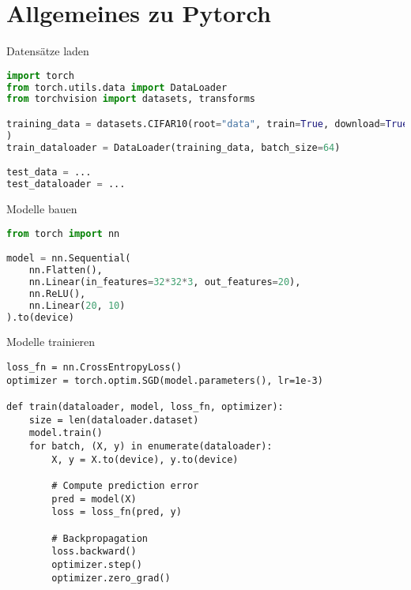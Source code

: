 \section{Allgemeines zu Pytorch}

\begin{frame}[fragile]{Datensätze laden}
\begin{lstlisting}[language=Python]
import torch
from torch.utils.data import DataLoader
from torchvision import datasets, transforms

training_data = datasets.CIFAR10(root="data", train=True, download=True, transform=transforms.ToTensor()
)
train_dataloader = DataLoader(training_data, batch_size=64)

test_data = ...
test_dataloader = ...
\end{lstlisting}
\end{frame}

  
\begin{frame}[fragile]{Modelle bauen}
\begin{lstlisting}[language=Python]
from torch import nn

model = nn.Sequential(
    nn.Flatten(),
    nn.Linear(in_features=32*32*3, out_features=20),
    nn.ReLU(),
    nn.Linear(20, 10)
).to(device)

\end{lstlisting}
\end{frame}


\begin{frame}{Modelle trainieren}
\begin{lstlisting}
loss_fn = nn.CrossEntropyLoss()
optimizer = torch.optim.SGD(model.parameters(), lr=1e-3)

def train(dataloader, model, loss_fn, optimizer):
    size = len(dataloader.dataset)
    model.train()
    for batch, (X, y) in enumerate(dataloader):
        X, y = X.to(device), y.to(device)

        # Compute prediction error
        pred = model(X)
        loss = loss_fn(pred, y)

        # Backpropagation
        loss.backward()
        optimizer.step()
        optimizer.zero_grad()
\end{lstlisting}
\end{frame}

